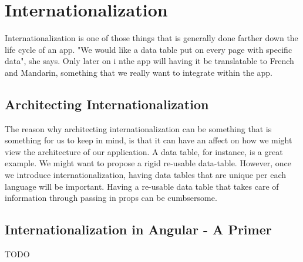 \maketitle{}
\section{ Internationalization }

Internationalization is one of those things that is generally done farther down
the life cycle of an app. "We would like a data table put on every page with
specific data", she says. Only later on i nthe app will having it be
translatable to French and Mandarin, something that we really want to integrate
within the app.

\subsection{ Architecting Internationalization }
The reason why architecting internationalization can be something that is
something for us to keep in mind, is that it can have an affect on how we might
view the architecture of our application. A data table, for instance, is a great
example. We might want to propose a rigid re-usable data-table. However, once
we introduce internationalization, having data tables that are unique per each
language will be important. Having a re-usable data table that takes care of
information through passing in props can be cumbsersome.

\subsection{ Internationalization in Angular - A Primer }
TODO
